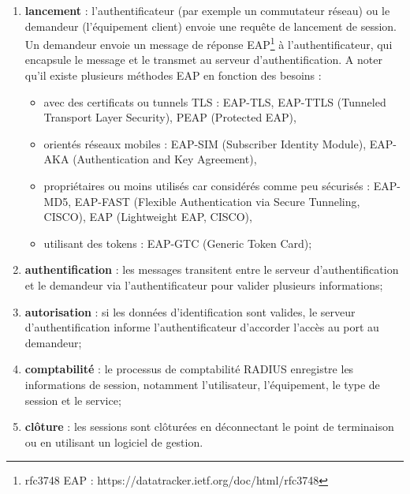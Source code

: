 \begin{enumerate}
    \item \textbf{lancement} : l'authentificateur (par exemple un commutateur réseau) ou le demandeur (l'équipement client) envoie une requête de lancement de session. Un demandeur envoie un message de réponse EAP\footnote{rfc3748 EAP : https://datatracker.ietf.org/doc/html/rfc3748} à l'authentificateur, qui encapsule le message et le transmet au serveur d'authentification. A noter qu'il existe plusieurs méthodes EAP en fonction des besoins : 
        \begin{itemize}
            \item avec des certificats ou tunnels TLS : EAP-TLS, EAP-TTLS (Tunneled Transport Layer Security), PEAP (Protected EAP),
            \item orientés réseaux mobiles : EAP-SIM (Subscriber Identity Module), EAP-AKA (Authentication and Key Agreement),
            \item propriétaires ou moins utilisés car considérés comme peu sécurisés : EAP-MD5, EAP-FAST (Flexible Authentication via Secure Tunneling, CISCO), EAP (Lightweight EAP, CISCO),
            \item utilisant des tokens : EAP-GTC (Generic Token Card);
        \end{itemize}
    \item \textbf{authentification} : les messages transitent entre le serveur d'authentification et le demandeur via l'authentificateur pour valider plusieurs informations;
    \item \textbf{autorisation} : si les données d'identification sont valides, le serveur d'authentification informe l'authentificateur d'accorder l'accès au port au demandeur;
    \item \textbf{comptabilité} : le processus de comptabilité RADIUS enregistre les informations de session, notamment l'utilisateur, l'équipement, le type de session et le service;
    \item \textbf{clôture} : les sessions sont clôturées en déconnectant le point de terminaison ou en utilisant un logiciel de gestion.
\end{enumerate}



